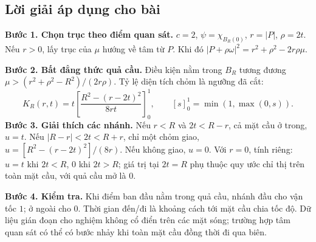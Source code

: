 \documentclass[10pt,a4paper]{article}
\begin{document}
\subsection*{Lời giải áp dụng cho bài}
\textbf{Bước 1. Chọn trục theo điểm quan sát.} $c=2$, $\psi=\chi_{B_R(0)}$, $r=|P|$, $\rho=2t$. Nếu $r>0$, lấy trục của $\mu$ hướng về tâm từ $P$. Khi đó $|P+\rho\omega|^2=r^2+\rho^2-2r\rho\mu$.

\textbf{Bước 2. Bất đẳng thức quả cầu.} Điều kiện nằm trong $B_R$ tương đương $\mu>(r^2+\rho^2-R^2)/(2r\rho)$. Tỷ lệ diện tích chỏm là ngưỡng đã cắt:
\[K_R(r,t)=t\left[\frac{R^2-(r-2t)^2}{8rt}\right]_0^1,\qquad [s]_0^1=\min(1,\max(0,s)).\]
\textbf{Bước 3. Giải thích các nhánh.} Nếu $r<R$ và $2t<R-r$, cả mặt cầu ở trong, $u=t$. Nếu $|R-r|<2t<R+r$, chỉ một chỏm giao, $u=[R^2-(r-2t)^2]/(8r)$. Nếu không giao, $u=0$. Với $r=0$, tính riêng: $u=t$ khi $2t<R$, $0$ khi $2t>R$; giá trị tại $2t=R$ phụ thuộc quy ước chỉ thị trên toàn mặt cầu, với quả cầu mở là $0$.

\textbf{Bước 4. Kiểm tra.} Khi điểm ban đầu nằm trong quả cầu, nhánh đầu cho vận tốc $1$; ở ngoài cho $0$. Thời gian đến/đi là khoảng cách tới mặt cầu chia tốc độ. Dữ liệu gián đoạn cho nghiệm không cổ điển trên các mặt sóng; trường hợp tâm quan sát có thể có bước nhảy khi toàn mặt cầu đồng thời đi qua biên.
\end{document}
